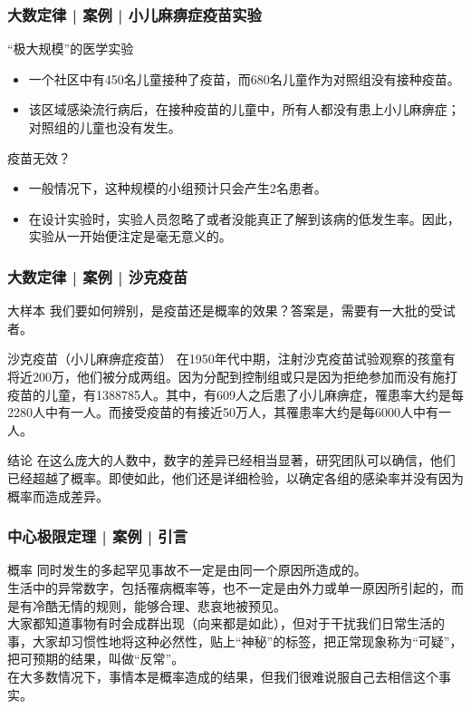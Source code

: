 \begin{frame}
  \frametitle{大数定律 | 案例 | 小儿麻痹症疫苗实验}
  \begin{block}{“极大规模”的医学实验}
    \begin{itemize}
      \item 一个社区中有450名儿童接种了疫苗，而680名儿童作为对照组没有接种疫苗。
      \item 该区域感染流行病后，在接种疫苗的儿童中，所有人都没有患上小儿麻痹症；对照组的儿童也没有发生。
    \end{itemize}
  \end{block}
  \pause
  \begin{block}{疫苗无效？}
    \begin{itemize}
      \item 一般情况下，这种规模的小组预计只会产生2名患者。
      \item 在设计实验时，实验人员忽略了或者没能真正了解到该病的低发生率。因此，实验从一开始便注定是毫无意义的。
    \end{itemize}
  \end{block}
\end{frame}

\begin{frame}
  \frametitle{大数定律 | 案例 | 沙克疫苗}
  \begin{block}{大样本}
    我们要如何辨别，是疫苗还是概率的效果？答案是，需要有一大批的受试者。
  \end{block}
  \pause
  \begin{block}{沙克疫苗（小儿麻痹症疫苗）}
    在1950年代中期，注射沙克疫苗试验观察的孩童有将近200万，他们被分成两组。因为分配到控制组或只是因为拒绝参加而没有施打疫苗的儿童，有1388785人。其中，有609人之后患了小儿麻痹症，罹患率大约是每2280人中有一人。而接受疫苗的有接近50万人，其罹患率大约是每6000人中有一人。
  \end{block}
  \pause
  \begin{block}{结论}
    在这么庞大的人数中，数字的差异已经相当显著，研究团队可以确信，他们已经超越了概率。即使如此，他们还是详细检验，以确定各组的感染率并没有因为概率而造成差异。
  \end{block}
\end{frame}

\begin{frame}
  \frametitle{中心极限定理 | 案例 | 引言}
  \begin{block}{概率}
    同时发生的多起罕见事故不一定是由同一个原因所造成的。\\
    \vspace{0.5em}
    生活中的异常数字，包括罹病概率等，也不一定是由外力或单一原因所引起的，而是有冷酷无情的规则，能够合理、悲哀地被预见。\\
    \vspace{0.5em}
大家都知道事物有时会成群出现（向来都是如此），但对于干扰我们日常生活的事，大家却习惯性地将这种必然性，贴上“神秘”的标签，把正常现象称为“可疑”，把可预期的结果，叫做“反常”。\\
    \vspace{0.5em}
    在大多数情况下，事情本是概率造成的结果，但我们很难说服自己去相信这个事实。
  \end{block}
\end{frame}

